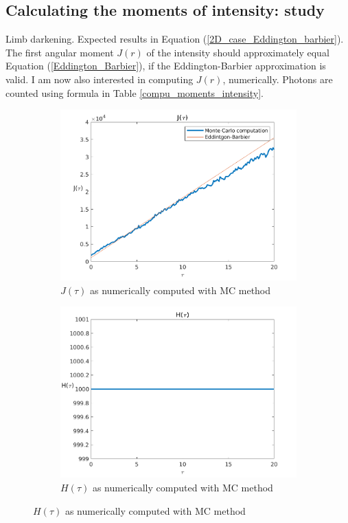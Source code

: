 \documentclass[../main/main.tex]{subfiles}
\begin{document}
\newpage
\subsection{Calculating the moments of intensity: study}
\label{limb_darkening_moments_intensity}

Limb darkening. Expected results in Equation (\ref{2D_case_Eddington_barbier}). The first angular moment $J(r)$ of the intensity should approximately equal Equation (\ref{Eddington_Barbier}), if the Eddington-Barbier approximation is valid. I am now also interested in computing $J(r)$, numerically. Photons are counted using formula in Table \ref{compu_moments_intensity}.

\begin{figure}[!htp]
\hspace*{-0.5in}
\centering
\begin{subfigure}{.6\textwidth}
\includegraphics[width=1\textwidth]{../../introductory_exercises/limb_darkening/figures/J_vs_tau_nphot1000.png}
\caption{$J(\tau)$ as numerically computed with MC method}
\label{J(tau)}
\end{subfigure}%
\begin{subfigure}{.6\textwidth}
\includegraphics[width=1\textwidth]{../../introductory_exercises/limb_darkening/figures/H_vs_tau_nphot1000.png}
\caption{$H(\tau)$ as numerically computed with MC method}
\label{J(tau)}
\end{subfigure}
\end{figure}
\end{document}
